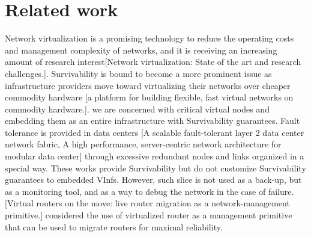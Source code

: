 \section{Related work}
Network virtualization is a promising technology to reduce the operating costs and management complexity of networks, and it is receiving an increasing amount of research interest[Network virtualization: State of the art and research challenges.]. Survivability is bound to become a more prominent issue as infrastructure providers move toward virtualizing their networks over cheaper commodity hardware [a platform for building flexible, fast virtual networks on commodity hardware.]. we are concerned with critical virtual nodes and embedding them as an entire infrastructure with Survivability guarantees.
Fault tolerance is provided in data centers [A scalable fault-tolerant layer 2
data center network fabric, A high performance, server-centric network architecture for modular data center] through excessive redundant nodes and links organized in a special way. These works provide Survivability but do not customize Survivability guarantees to embedded VInfs. However, such slice is not used as a back-up, but as a monitoring tool, and as a way to debug
the network in the case of failure. [Virtual routers on the move: live
router migration as a network-management primitive.] considered the use
of virtualized router as a management primitive that can be used to migrate routers for maximal reliability.


